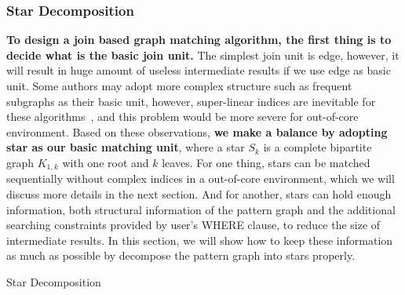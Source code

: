 \subsubsection{Star Decomposition}\label{sec:star_decomposition}
\textbf{To design a join based graph matching algorithm, the first thing is to decide what is the basic join unit.}
The simplest join unit is edge, however, it will result in huge amount of useless intermediate results if we use edge as basic unit.
Some authors may adopt more complex structure such as frequent subgraphs as their basic unit,
however, super-linear indices are inevitable for these algorithms~\cite{DBLP:journals/pvldb/SunWWSL12},
and this problem would be more severe for out-of-core environment.
Based on these observations, \textbf{we make a balance by adopting star as our basic matching unit},
where a star $S_k$ is a complete bipartite graph $K_{1,k}$ with one root and $k$ leaves.
For one thing, stars can be matched sequentially without complex indices in a out-of-core environment,
which we will discuss more details in the next section.
And for another, stars can hold enough information, both structural information of the pattern graph and the additional searching constraints provided by user's WHERE clause, to reduce the size of intermediate results.
In this section, we will show how to keep these information as much as possible by decompose the pattern graph into stars properly.

\begin{algorithm}[ht]
  \caption{Star Decomposition}\label{alg:decompose_stars}
\end{algorithm}

